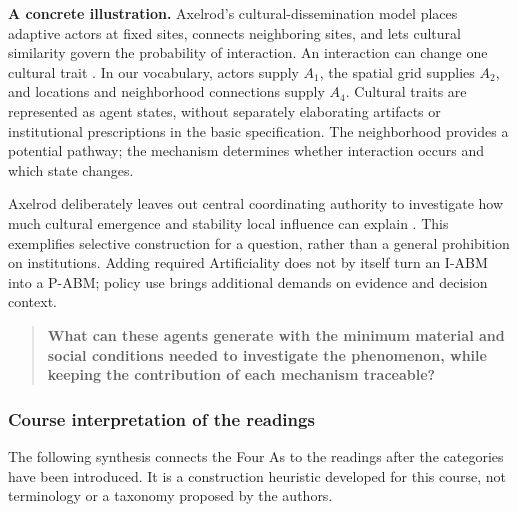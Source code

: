 \documentclass[11pt,a4paper]{article}
\begin{document}
\textbf{A concrete illustration.} Axelrod's cultural-dissemination model places adaptive actors at fixed sites, connects neighboring sites, and lets cultural similarity govern the probability of interaction. An interaction can change one cultural trait \cite[pp.~207--208]{axelrod_dissemination_1997}. In our vocabulary, actors supply $A_1$, the spatial grid supplies $A_2$, and locations and neighborhood connections supply $A_4$. Cultural traits are represented as agent states, without separately elaborating artifacts or institutional prescriptions in the basic specification. The neighborhood provides a potential pathway; the mechanism determines whether interaction occurs and which state changes.

Axelrod deliberately leaves out central coordinating authority to investigate how much cultural emergence and stability local influence can explain \cite[p.~207]{axelrod_dissemination_1997}. This exemplifies selective construction for a question, rather than a general prohibition on institutions. Adding required Artificiality does not by itself turn an I-ABM into a P-ABM; policy use brings additional demands on evidence and decision context.

\begin{quote}
\textbf{What can these agents generate with the minimum material and social conditions needed to investigate the phenomenon, while keeping the contribution of each mechanism traceable?}
\end{quote}

\subsubsection{Course interpretation of the readings}
The following synthesis connects the Four As to the readings after the categories have been introduced. It is a construction heuristic developed for this course, not terminology or a taxonomy proposed by the authors.
\end{document}
